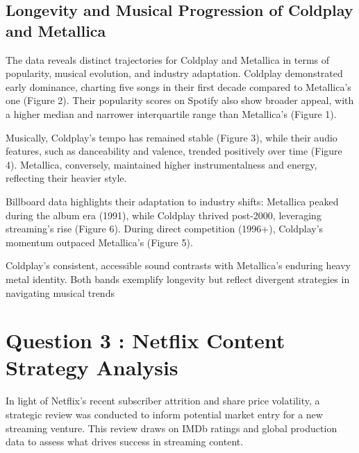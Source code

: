 \documentclass[
  man,floatsintext]{apa6}
\begin{document}
\subsection{Longevity and Musical Progression of Coldplay and Metallica}\label{longevity-and-musical-progression-of-coldplay-and-metallica}

The data reveals distinct trajectories for Coldplay and Metallica in terms of popularity, musical evolution, and industry adaptation. Coldplay demonstrated early dominance, charting five songs in their first decade compared to Metallica's one (Figure 2). Their popularity scores on Spotify also show broader appeal, with a higher median and narrower interquartile range than Metallica's (Figure 1).

Musically, Coldplay's tempo has remained stable (Figure 3), while their audio features, such as danceability and valence, trended positively over time (Figure 4). Metallica, conversely, maintained higher instrumentalness and energy, reflecting their heavier style.

Billboard data highlights their adaptation to industry shifts: Metallica peaked during the album era (1991), while Coldplay thrived post-2000, leveraging streaming's rise (Figure 6). During direct competition (1996+), Coldplay's momentum outpaced Metallica's (Figure 5).

Coldplay's consistent, accessible sound contrasts with Metallica's enduring heavy metal identity. Both bands exemplify longevity but reflect divergent strategies in navigating musical trends

\section{Question 3 : Netflix Content Strategy Analysis}\label{question-3-netflix-content-strategy-analysis}

In light of Netflix's recent subscriber attrition and share price volatility, a strategic review was conducted to inform potential market entry for a new streaming venture. This review draws on IMDb ratings and global production data to assess what drives success in streaming content.
\end{document}
